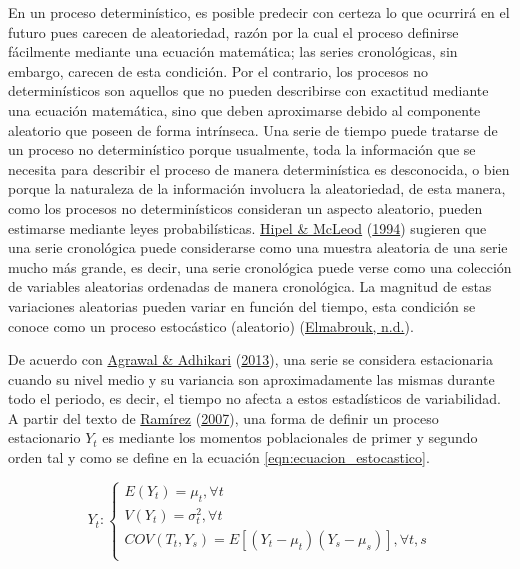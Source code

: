 \documentclass[
]{article}
\begin{document}
En un proceso determinístico, es posible predecir con certeza lo que
ocurrirá en el futuro pues carecen de aleatoriedad, razón por la cual el
proceso definirse fácilmente mediante una ecuación matemática; las
series cronológicas, sin embargo, carecen de esta condición. Por el
contrario, los procesos no determinísticos son aquellos que no pueden
describirse con exactitud mediante una ecuación matemática, sino que
deben aproximarse debido al componente aleatorio que poseen de forma
intrínseca. Una serie de tiempo puede tratarse de un proceso no
determinístico porque usualmente, toda la información que se necesita
para describir el proceso de manera determinística es desconocida, o
bien porque la naturaleza de la información involucra la aleatoriedad,
de esta manera, como los procesos no determinísticos consideran un
aspecto aleatorio, pueden estimarse mediante leyes probabilísticas.
\protect\hyperlink{ref-Hipel}{Hipel \& McLeod}
(\protect\hyperlink{ref-Hipel}{1994}) sugieren que una serie cronológica
puede considerarse como una muestra aleatoria de una serie mucho más
grande, es decir, una serie cronológica puede verse como una colección
de variables aleatorias ordenadas de manera cronológica. La magnitud de
estas variaciones aleatorias pueden variar en función del tiempo, esta
condición se conoce como un proceso estocástico (aleatorio)
(\protect\hyperlink{ref-definicion_estocastico}{Elmabrouk, n.d.}).

De acuerdo con \protect\hyperlink{ref-stationary_def}{Agrawal \&
Adhikari} (\protect\hyperlink{ref-stationary_def}{2013}), una serie se
considera estacionaria cuando su nivel medio y su variancia son
aproximadamente las mismas durante todo el periodo, es decir, el tiempo
no afecta a estos estadísticos de variabilidad. A partir del texto de
\protect\hyperlink{ref-introduccion_series}{Ramírez}
(\protect\hyperlink{ref-introduccion_series}{2007}), una forma de
definir un proceso estacionario \(Y_t\) es mediante los momentos
poblacionales de primer y segundo orden tal y como se define en la
ecuación \ref{eqn:ecuacion_estocastico}.

\begin{equation}
\label{eqn:ecuacion_estocastico}
Y_t:
\begin{cases}
E(Y_t) = \mu_t, \forall t \\
V(Y_t) = \sigma^2_t, \forall t \\
COV(T_t,Y_s) = E\left[(Y_t-\mu_t)(Y_s-\mu_s)\right], \forall t,s \\
\end{cases}
\end{equation}
\end{document}
